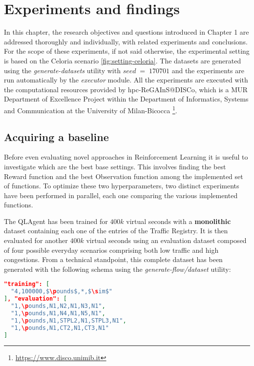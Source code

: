 \chapter{Experiments and findings}

In this chapter, the research objectives and questions introduced in Chapter 1 are addressed thoroughly and individually, with related experiments and conclusions.
For the scope of these experiments, if not said otherwise, the experimental setting is based on the Celoria scenario \ref{fig:setting-celoria}.
The datasets are generated using the \textit{generate-datasets} utility with $seed \; = \; 170701$ and the experiments are run automatically by the \textit{executor} module.
All the experiments are executed with the computational resources provided by hpc-ReGAInS@DISCo, which is a MUR Department of Excellence Project within the Department of Informatics, Systems and Communication at the University of Milan-Bicocca \footnote{\href{https://www.disco.unimib.it}{https://www.disco.unimib.it}}.

\section{Acquiring a baseline}
  
  Before even evaluating novel approaches in Reinforcement Learning it is useful to investigate which are the best base settings. This involves finding the best Reward function and the best Observation function among the implemented set of functions. To optimize these two hyperparameters, two distinct experiments have been performed in parallel, each one comparing the various implemented functions.

  The QLAgent has been trained for $400k$ virtual seconds with a \textbf{monolithic} dataset containing each one of the entries of the Traffic Registry. It is then evaluated for another $400k$ virtual seconds using an evaluation dataset composed of four possible everyday scenarios comprising both low traffic and high congestions. From a technical standpoint, this complete dataset has been generated with the following schema using the \textit{generate-flow/dataset} utility:

\noindent
\begin{minipage}{\linewidth}
\begin{lstlisting}[language=JSON, caption=The schema for the "Monolithic" Dataset, label={lst:dataset-schema-monolithic}, mathescape=true]
"training": [
  "4,100000,$\pounds$,*,$\sim$"
], "evaluation": [
  "1,\pounds,N1,N2,N1,N3,N1",
  "1,\pounds,N1,N4,N1,N5,N1",
  "1,\pounds,N1,STPL2,N1,STPL3,N1",
  "1,\pounds,N1,CT2,N1,CT3,N1"
]
\end{lstlisting}
\end{minipage}

